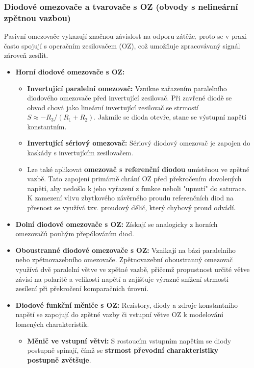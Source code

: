     \subsubsection{Diodové omezovače a tvarovače s OZ (obvody s nelineární zpětnou vazbou)}
        Pasivní omezovače vykazují značnou závislost na odporu zátěže, proto se v praxi často spojují s operačním zesilovačem (OZ), což umožňuje zpracovávaný signál zároveň zesílit.
        
        \begin{itemize}
            \item \textbf{Horní diodové omezovače s OZ:}
            \begin{itemize}
                \item \textbf{Invertující paralelní omezovač:} Vznikne zařazením paralelního diodového omezovače před invertující zesilovač. Při zavřené diodě se obvod chová jako lineární invertující zesilovač se strmostí $S \approx -R_3/(R_1 + R_2)$. Jakmile se dioda otevře, stane se výstupní napětí konstantním.
                \item \textbf{Invertující sériový omezovač:} Sériový diodový omezovač je zapojen do kaskády s invertujícím zesilovačem.
                \item Lze také aplikovat \textbf{omezovač s referenční diodou} umístěnou ve zpětné vazbě. Tato zapojení primárně chrání OZ před překročením dovolených napětí, aby nedošlo k jeho vyřazení z funkce neboli "upnutí" do saturace. K zamezení vlivu zbytkového závěrného proudu referenčních diod na přesnost se využívá tzv. proudový dělič, který chybový proud odvádí.
            \end{itemize}
            \item \textbf{Dolní diodové omezovače s OZ:} Získají se analogicky z horních omezovačů pouhým přepólováním diod.
            \item \textbf{Oboustranné diodové omezovače s OZ:} Vznikají na bázi paralelního nebo zpětnovazebního omezovače. Zpětnovazební oboustranný omezovač využívá dvě paralelní větve ve zpětné vazbě, přičemž propustnost určité větve závisí na polaritě a velikosti napětí a zajišťuje výrazné snížení strmosti zesílení při překročení komparačních úrovní.
            \item \textbf{Diodové funkční měniče s OZ:} Rezistory, diody a zdroje konstantního napětí se zapojují do zpětné vazby či vstupní větve OZ k modelování lomených charakteristik.
            \begin{itemize}
                \item \textbf{Měnič ve vstupní větvi:} S rostoucím vstupním napětím se diody postupně spínají, čímž se \textbf{strmost převodní charakteristiky postupně zvětšuje}.

\end{itemize}
\end{itemize}
